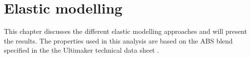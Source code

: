 \chapter{Elastic modelling}
\label{chp:6}
\graphicspath{{chapter_6_Elasticmodelling/figures/chapter_6.tex}}%

This chapter discusses the different elastic modelling approaches and will present the results. The properties used in this analysis are based on the ABS blend specified in the the Ultimaker technical data sheet \cite{Ultimaker2018TechnicalABS}.



